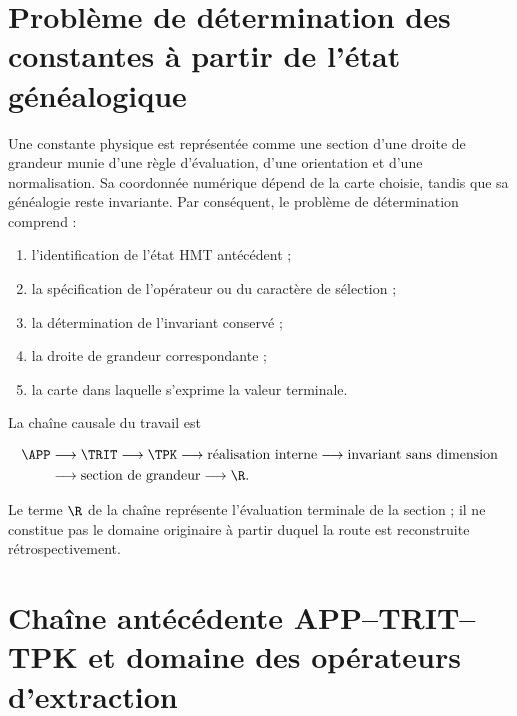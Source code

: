 \label{chap:p3-83-23-algebra_clasificacion}





\label{p3-83-c23-s1:ch:foundation}

\section{Problème de détermination des constantes à partir de l’état généalogique}

Une constante physique est représentée comme une section d’une droite de
grandeur munie d’une règle d’évaluation, d’une orientation et d’une normalisation.
Sa coordonnée numérique dépend de la carte choisie, tandis que sa
généalogie reste invariante. Par conséquent, le problème de
détermination comprend :

\begin{enumerate}
\item l’identification de l’état HMT antécédent ;
\item la spécification de l’opérateur ou du caractère de sélection ;
\item la détermination de l’invariant conservé ;
\item la droite de grandeur correspondante ;
\item la carte dans laquelle s’exprime la valeur terminale.
\end{enumerate}

La chaîne causale du travail est

\begin{equation}
\begin{aligned}
\APP&\longrightarrow\TRIT\longrightarrow\TPK
\longrightarrow\text{réalisation interne}
\longrightarrow\text{invariant sans dimension}\\
&\longrightarrow\text{section de grandeur}
\longrightarrow\R.
\end{aligned}
\label{p3-83-c23-s1:eq:master-chain}
\end{equation}

Le terme \(\R\) de la chaîne représente l’évaluation terminale de la
section ; il ne constitue pas le domaine originaire à partir duquel la route est
reconstruite rétrospectivement.

\section{Chaîne antécédente APP--TRIT--TPK et domaine des opérateurs d’extraction}

